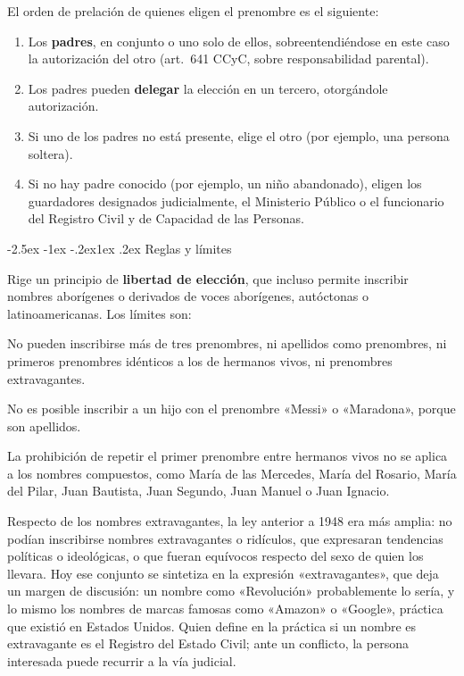 \documentclass[12pt,oneside]{book}
\makeatletter
\renewcommand\subsection{\@startsection{subsection}{2}{\z@}%
  {-2.5ex \@plus -1ex \@minus -.2ex}{1ex \@plus .2ex}%
  {\normalfont\normalsize\bfseries}}
\makeatother
\begin{document}
El orden de prelación de quienes eligen el prenombre es el siguiente:

\begin{enumerate}
\item Los \textbf{padres}, en conjunto o uno solo de ellos, sobreentendiéndose en este caso la autorización del otro (art.~641 CCyC, sobre responsabilidad parental).
\item Los padres pueden \textbf{delegar} la elección en un tercero, otorgándole autorización.
\item Si uno de los padres no está presente, elige el otro (por ejemplo, una persona soltera).
\item Si no hay padre conocido (por ejemplo, un niño abandonado), eligen los guardadores designados judicialmente, el Ministerio Público o el funcionario del Registro Civil y de Capacidad de las Personas.
\end{enumerate}

\subsection{Reglas y límites}

Rige un principio de \textbf{libertad de elección}, que incluso permite inscribir nombres aborígenes o derivados de voces aborígenes, autóctonas o latinoamericanas. Los límites son:

\begin{importante}
No pueden inscribirse más de tres prenombres, ni apellidos como prenombres, ni primeros prenombres idénticos a los de hermanos vivos, ni prenombres extravagantes.
\end{importante}

\begin{ejemplo}
No es posible inscribir a un hijo con el prenombre «Messi» o «Maradona», porque son apellidos.
\end{ejemplo}

La prohibición de repetir el primer prenombre entre hermanos vivos no se aplica a los nombres compuestos, como María de las Mercedes, María del Rosario, María del Pilar, Juan Bautista, Juan Segundo, Juan Manuel o Juan Ignacio.

Respecto de los nombres extravagantes, la ley anterior a 1948 era más amplia: no podían inscribirse nombres extravagantes o ridículos, que expresaran tendencias políticas o ideológicas, o que fueran equívocos respecto del sexo de quien los llevara. Hoy ese conjunto se sintetiza en la expresión «extravagantes», que deja un margen de discusión: un nombre como «Revolución» probablemente lo sería, y lo mismo los nombres de marcas famosas como «Amazon» o «Google», práctica que existió en Estados Unidos. Quien define en la práctica si un nombre es extravagante es el Registro del Estado Civil; ante un conflicto, la persona interesada puede recurrir a la vía judicial.
\end{document}
